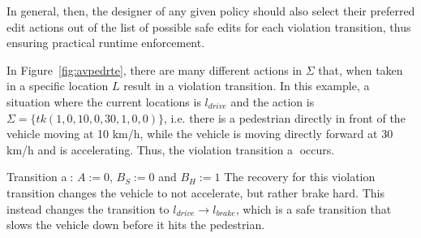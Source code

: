In general, then, the designer of any given policy should also select their preferred edit actions out of the list of possible safe edits for each violation transition, thus ensuring practical runtime enforcement.

\begin{example}
	In Figure~\ref{fig:avpedrte}, there are many different actions in $\Sigma$ that, when taken in a specific location $L$ result in a violation transition.
	In this example, a situation where the current locations is $l_{drive}$ and the action is $\Sigma = \{tk(1, 0, 10, 0, 30, 1, 0, 0)\}$, i.e. there is a pedestrian directly in front of the vehicle moving at 10 km/h, while the vehicle is moving directly forward at 30 km/h and is accelerating.
	Thus, the violation transition \textcircled{a} occurs.
	\squishlist
	\item Transition \textcircled{a}: $A := 0$, $B_S := 0$ and $B_H := 1$
	\squishend
	The recovery for this violation transition changes the vehicle to not accelerate, but rather brake hard.
	This instead changes the transition to $l_{drive} \rightarrow l_{brake}$, which is a safe transition that slows the vehicle down before it hits the pedestrian.
\end{example}
